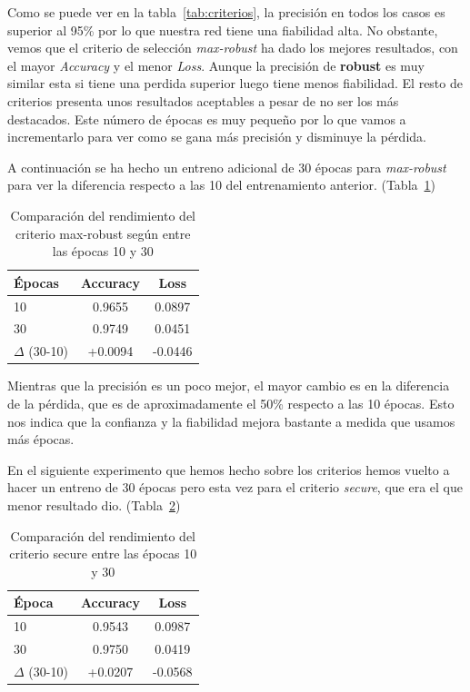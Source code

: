 \documentclass[conference,a4paper]{IEEEtran}
\begin{document}
Como se puede ver en la tabla~\ref{tab:criterios}, la precisión en todos los casos es superior al 95\% por lo que nuestra red tiene una fiabilidad alta. No obstante, vemos que el criterio de selección \textit{max-robust} ha dado los mejores resultados, con el mayor \textit{Accuracy} y el menor \textit{Loss}. Aunque la precisión de \textbf{robust} es muy similar esta si tiene una perdida superior luego tiene menos fiabilidad. El resto de criterios presenta unos resultados aceptables a pesar de no ser los más destacados. Este número de épocas es muy pequeño por lo que vamos a incrementarlo para ver como se gana más precisión y disminuye la pérdida.

A continuación se ha hecho un entreno adicional de 30 épocas para \textit{max-robust} para ver la diferencia respecto a las 10 del entrenamiento anterior. (Tabla~\ref{tab:maxrobust_comparacion})

\begin{table}[h]
\centering
\caption{Comparación del rendimiento del criterio max-robust según entre las épocas 10 y 30}
\label{tab:maxrobust_comparacion}
\begin{tabular}{lcc}
\hline
\textbf{Épocas} & \textbf{Accuracy} & \textbf{Loss} \\
\hline
10 & 0.9655 & 0.0897 \\
30 & 0.9749 & 0.0451 \\
\hline
$\Delta$ (30-10) & +0.0094 & -0.0446 \\
\hline
\end{tabular}
\end{table}

Mientras que la precisión es un poco mejor, el mayor cambio es en la diferencia de la pérdida, que es de aproximadamente el 50\% respecto a las 10 épocas. Esto nos indica que la confianza y la fiabilidad mejora bastante a medida que usamos más épocas.

En el siguiente experimento que hemos hecho sobre los criterios hemos vuelto a hacer un entreno de 30 épocas pero esta vez para el criterio \textit{secure}, que era el que menor resultado dio. (Tabla~\ref{tab:secure_10_30})

\begin{table}[h]
\centering
\caption{Comparación del rendimiento del criterio secure entre las épocas 10 y 30}
\label{tab:secure_10_30}
\begin{tabular}{lcc}
\hline
\textbf{Época} & \textbf{Accuracy} & \textbf{Loss} \\
\hline
10 & 0.9543 & 0.0987 \\
30 & 0.9750 & 0.0419 \\
\hline
$\Delta$ (30-10) & +0.0207 & -0.0568 \\
\hline
\end{tabular}
\end{table}
\end{document}
